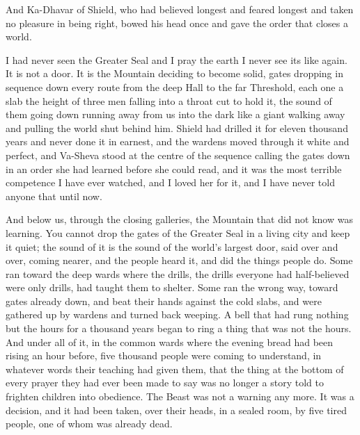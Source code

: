 And Ka-Dhavar of Shield, who had believed longest and feared longest and taken no pleasure in being right, bowed his head once and gave the order that closes a world.\par

\ornament

I had never seen the Greater Seal and I pray the earth I never see its like again. It is not a door. It is the Mountain deciding to become solid, gates dropping in sequence down every route from the deep Hall to the far Threshold, each one a slab the height of three men falling into a throat cut to hold it, the sound of them going down running away from us into the dark like a giant walking away and pulling the world shut behind him. Shield had drilled it for eleven thousand years and never done it in earnest, and the wardens moved through it white and perfect, and Va-Sheva stood at the centre of the sequence calling the gates down in an order she had learned before she could read, and it was the most terrible competence I have ever watched, and I loved her for it, and I have never told anyone that until now.\par

And below us, through the closing galleries, the Mountain that did not know was learning. You cannot drop the gates of the Greater Seal in a living city and keep it quiet; the sound of it is the sound of the world's largest door, said over and over, coming nearer, and the people heard it, and did the things people do. Some ran toward the deep wards where the drills, the drills everyone had half-believed were only drills, had taught them to shelter. Some ran the wrong way, toward gates already down, and beat their hands against the cold slabs, and were gathered up by wardens and turned back weeping. A bell that had rung nothing but the hours for a thousand years began to ring a thing that was not the hours. And under all of it, in the common wards where the evening bread had been rising an hour before, five thousand people were coming to understand, in whatever words their teaching had given them, that the thing at the bottom of every prayer they had ever been made to say was no longer a story told to frighten children into obedience. The Beast was not a warning any more. It was a decision, and it had been taken, over their heads, in a sealed room, by five tired people, one of whom was already dead.\par

